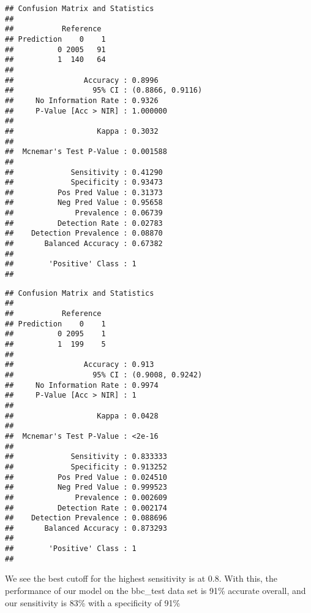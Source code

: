 \documentclass[
]{article}
\begin{document}
\begin{verbatim}
## Confusion Matrix and Statistics
## 
##           Reference
## Prediction    0    1
##          0 2005   91
##          1  140   64
##                                           
##                Accuracy : 0.8996          
##                  95% CI : (0.8866, 0.9116)
##     No Information Rate : 0.9326          
##     P-Value [Acc > NIR] : 1.000000        
##                                           
##                   Kappa : 0.3032          
##                                           
##  Mcnemar's Test P-Value : 0.001588        
##                                           
##             Sensitivity : 0.41290         
##             Specificity : 0.93473         
##          Pos Pred Value : 0.31373         
##          Neg Pred Value : 0.95658         
##              Prevalence : 0.06739         
##          Detection Rate : 0.02783         
##    Detection Prevalence : 0.08870         
##       Balanced Accuracy : 0.67382         
##                                           
##        'Positive' Class : 1               
## 
\end{verbatim}

\begin{verbatim}
## Confusion Matrix and Statistics
## 
##           Reference
## Prediction    0    1
##          0 2095    1
##          1  199    5
##                                           
##                Accuracy : 0.913           
##                  95% CI : (0.9008, 0.9242)
##     No Information Rate : 0.9974          
##     P-Value [Acc > NIR] : 1               
##                                           
##                   Kappa : 0.0428          
##                                           
##  Mcnemar's Test P-Value : <2e-16          
##                                           
##             Sensitivity : 0.833333        
##             Specificity : 0.913252        
##          Pos Pred Value : 0.024510        
##          Neg Pred Value : 0.999523        
##              Prevalence : 0.002609        
##          Detection Rate : 0.002174        
##    Detection Prevalence : 0.088696        
##       Balanced Accuracy : 0.873293        
##                                           
##        'Positive' Class : 1               
## 
\end{verbatim}

We see the best cutoff for the highest sensitivity is at 0.8. With this,
the performance of our model on the bbc\_test data set is 91\% accurate
overall, and our sensitivity is 83\% with a specificity of 91\%
\end{document}
